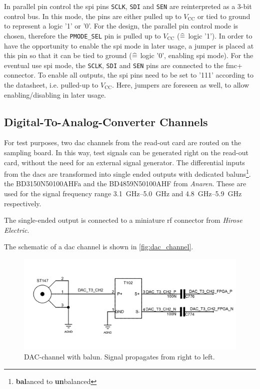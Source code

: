 In parallel pin control the \gls{spi} pins \texttt{SCLK}, \texttt{SDI} and \texttt{SEN} are reinterpreted as a 3-bit control bus.
In this mode, the pins are either pulled up to $V_\text{CC}$ or tied to ground to represent a logic '1' or '0'.
For the design, the parallel pin control mode is chosen, therefore the \texttt{PMODE\_SEL} pin is pulled up to $V_\text{CC}$ ($\mathrel{\widehat{=}}$ logic '1').
In order to have the opportunity to enable the \gls{spi} mode in later usage, a jumper is placed at this pin so that it can be tied to ground ($\mathrel{\widehat{=}}$ logic '0', enabling \gls{spi} mode).
For the eventual use \gls{spi} mode, the \texttt{SCLK}, \texttt{SDI} and \texttt{SEN} pins are connected to the \gls{fmc}+ connector.
To enable all outputs, the \gls{spi} pins need to be set to '111' according to the datasheet, i.e. pulled-up to $V_\text{CC}$. 
Here, jumpers are foreseen as well, to allow enabling/disabling in later usage.

\subsection{Digital-To-Analog-Converter Channels}
For test purposes, two \gls{dac} channels from the read-out card are routed on the sampling board.
In this way, test signals can be generated right on the read-out card, without the need for an external signal generator. 
The differential inputs from the \glspl{dac} are transformed into single ended outputs with dedicated baluns\footnote{\textbf{bal}anced to \textbf{un}balanced}. the BD3150N50100AHFa and the BD4859N50100AHF from \textit{Anaren}. These are used for the signal frequency range \SIrange{3.1}{5.0}{\GHz} and \SIrange{4.8}{5.9}{\GHz} respectively.

The single-ended output is connected to a miniature \gls{rf} connector from \textit{Hirose Electric}.

The schematic of a \gls{dac} channel is shown in \autoref{fig:dac_channel}.
\begin{figure}[tbh]
	\centering
	\includegraphics[width = \textwidth]{chap/04-work/img/dac_channel}
	\caption{DAC-channel with balun. Signal propagates from right to left.}
	\label{fig:dac_channel}
\end{figure}


